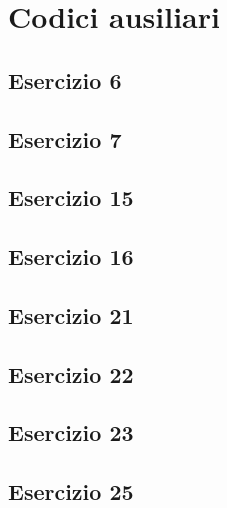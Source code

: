 \section{Codici ausiliari}

\subsection{Esercizio 6}

 
\subsection{Esercizio 7}


\subsection{Esercizio 15}


\subsection{Esercizio 16}


\subsection{Esercizio 21}


\subsection{Esercizio 22}


\subsection{Esercizio 23}


\subsection{Esercizio 25}
